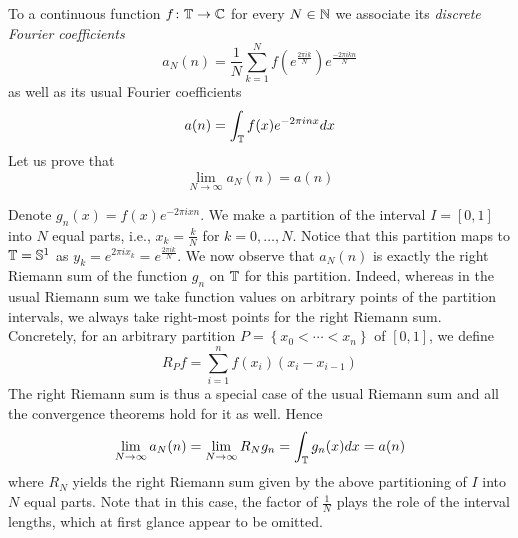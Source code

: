 \documentclass[a4paper, 12pt]{article}
\begin{document}
\begin{Exercise}
    To a continuous function $f \colon \mathbb{T} \to \mathbb{C}$ for every $N \in \mathbb{N}$ we associate its \emph{discrete Fourier coefficients}
    \[
        a_N(n) = \frac{1}{N} \sum_{k = 1}^{N} f(e^{\frac{2\pi ik}{N}}) e^{\frac{-2\pi ikn}{N}}
    \]
    as well as its usual Fourier coefficients
    \[
        a(n) = \int_{\mathbb{T}} f(x) e^{-2\pi inx} dx
    \]
    Let us prove that
    \[
        \lim_{N\to\infty} a_N(n) = a(n)
    \]
    
    Denote $g_n(x) = f(x)e^{-2\pi ixn}$.
    We make a partition of the interval $I = [0, 1]$ into $N$ equal parts,
    i.e., $x_k = \frac{k}{N}$ for $k = 0,\dots,N$.
    Notice that this partition maps to $\mathbb{T} = \mathbb{S}^1$ as $y_k = e^{2\pi i x_k} =
    e^{\frac{2\pi i k}{N}}$.  We now observe that $a_N(n)$ is exactly the right
    Riemann sum of the function $g_n$ on $\mathbb{T}$ for this partition.  Indeed,
    whereas in the usual Riemann sum we take function values on arbitrary
    points of the partition intervals, we always take right-most points for the
    right Riemann sum. Concretely, for an arbitrary partition
    $P = \left\{ x_0<\cdots<x_n \right\}$ of $[0,1]$, we define
    \[
        R_Pf = \sum_{i = 1}^{n} f(x_i)(x_i - x_{i-1})
    \]
    The right Riemann sum is thus a special case of the usual Riemann sum and
    all the convergence theorems hold for it as well.  Hence
    \[
        \lim_{N\to\infty} a_N(n) = \lim_{N\to\infty} R_Ng_n = \int_{\mathbb{T}} g_n(x) dx = a(n)
    \]
    where $R_N$ yields the right Riemann sum given by the above partitioning of
    $I$ into $N$ equal parts.  Note that in this case, the factor of
    $\frac{1}{N}$ plays the role of the interval lengths, which at first glance
    appear to be omitted.
\end{Exercise}

\nocite{Grafakos2014Classical}


\end{document}
